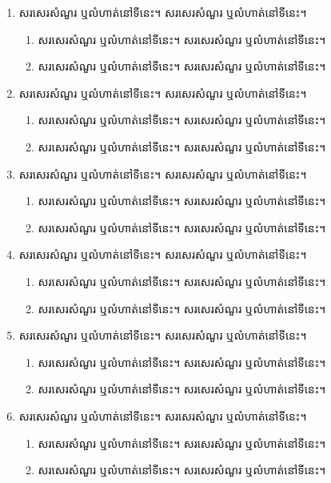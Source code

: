 \documentclass[12pt,a4paper]{pptexam}
\begin{document}
\topic[ប្រធាន]
\begin{enumerate}
	\item សរសេរសំណួរ ឬលំហាត់នៅទីនេះ។ សរសេរសំណួរ ឬលំហាត់នៅទីនេះ។ 
	\begin{enumerate}
		\item សរសេរសំណួរ ឬលំហាត់នៅទីនេះ។ សរសេរសំណួរ ឬលំហាត់នៅទីនេះ។ 
		\item សរសេរសំណួរ ឬលំហាត់នៅទីនេះ។ សរសេរសំណួរ ឬលំហាត់នៅទីនេះ។ 
	\end{enumerate}
	\item សរសេរសំណួរ ឬលំហាត់នៅទីនេះ។ សរសេរសំណួរ ឬលំហាត់នៅទីនេះ។ 
	\begin{enumerate}
		\item សរសេរសំណួរ ឬលំហាត់នៅទីនេះ។ សរសេរសំណួរ ឬលំហាត់នៅទីនេះ។ 
		\item សរសេរសំណួរ ឬលំហាត់នៅទីនេះ។ សរសេរសំណួរ ឬលំហាត់នៅទីនេះ។ 
	\end{enumerate}
	\item សរសេរសំណួរ ឬលំហាត់នៅទីនេះ។ សរសេរសំណួរ ឬលំហាត់នៅទីនេះ។ 
	\begin{enumerate}
		\item សរសេរសំណួរ ឬលំហាត់នៅទីនេះ។ សរសេរសំណួរ ឬលំហាត់នៅទីនេះ។ 
		\item សរសេរសំណួរ ឬលំហាត់នៅទីនេះ។ សរសេរសំណួរ ឬលំហាត់នៅទីនេះ។ 
	\end{enumerate}
	\item សរសេរសំណួរ ឬលំហាត់នៅទីនេះ។ សរសេរសំណួរ ឬលំហាត់នៅទីនេះ។ 
	\begin{enumerate}
		\item សរសេរសំណួរ ឬលំហាត់នៅទីនេះ។ សរសេរសំណួរ ឬលំហាត់នៅទីនេះ។ 
		\item សរសេរសំណួរ ឬលំហាត់នៅទីនេះ។ សរសេរសំណួរ ឬលំហាត់នៅទីនេះ។ 
	\end{enumerate}
	\item សរសេរសំណួរ ឬលំហាត់នៅទីនេះ។ សរសេរសំណួរ ឬលំហាត់នៅទីនេះ។ 
	\begin{enumerate}
		\item សរសេរសំណួរ ឬលំហាត់នៅទីនេះ។ សរសេរសំណួរ ឬលំហាត់នៅទីនេះ។ 
		\item សរសេរសំណួរ ឬលំហាត់នៅទីនេះ។ សរសេរសំណួរ ឬលំហាត់នៅទីនេះ។ 
	\end{enumerate}
	\item សរសេរសំណួរ ឬលំហាត់នៅទីនេះ។ សរសេរសំណួរ ឬលំហាត់នៅទីនេះ។ 
	\begin{enumerate}
		\item សរសេរសំណួរ ឬលំហាត់នៅទីនេះ។ សរសេរសំណួរ ឬលំហាត់នៅទីនេះ។ 
		\item សរសេរសំណួរ ឬលំហាត់នៅទីនេះ។ សរសេរសំណួរ ឬលំហាត់នៅទីនេះ។ 
	\end{enumerate}

\end{enumerate}
\end{document}
